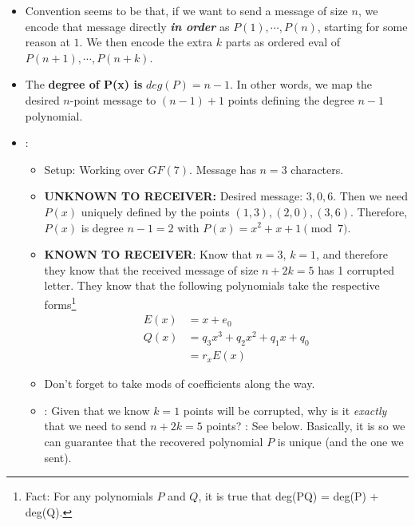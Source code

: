 \documentclass[12pt]{article}
\begin{document}
\begin{itemize}
\begin{itemize}
		\item Convention seems to be that, if we want to send a message of size $n$, we encode that message directly \textbf{\textit{in order}} as $P(1),\cdots,P(n)$, starting for some reason at $1$. We then encode the extra $k$ parts as ordered eval of $P(n+1), \cdots, P(n+k)$. 
		
		\item The \textbf{degree of P(x) is } $deg(P) = n - 1$. In other words, we map the desired $n$-point message to $(n-1) + 1$ points defining the degree $n - 1$ polynomial. 
		
		\item {}:
		\begin{small}
			\begin{itemize}
				\item Setup: Working over $GF(7)$. Message has $n=3$ characters. 
				
				\item \textbf{UNKNOWN TO RECEIVER:} Desired message: $3, 0, 6$. Then we need $P(x)$ uniquely defined by the points $(1, 3), (2, 0), (3, 6)$. Therefore, $P(x)$ is degree $n - 1 = 2$ with $P(x) = x^2 + x + 1 \pmod 7$. 
				
				\item \textbf{KNOWN TO RECEIVER}: Know that $n = 3$, $k = 1$, and therefore they know that the received message of size $n + 2k = 5$ has 1 corrupted letter. They know that the following polynomials take the respective forms\footnote{Fact: For any polynomials $P$ and $Q$, it is true that deg(PQ) = deg(P) + deg(Q).}
				\begin{align}
					E(x) &= x + e_0  \\
					Q(x) &= q_3 x^3 + q_2 x^2 + q_1 x + q_0 \\
					 &= r_x E(x) 
				\end{align}
				
				\item Don't forget to take mods of coefficients along the way. 
				
				\item {}: Given that we know $k=1$ points will be corrupted, why is it \textit{exactly} that we need to send $n + 2k = 5$ points? : See below. Basically, it is so we can guarantee that the recovered polynomial $P$ is unique (and the one we sent). 
			\end{itemize}
		\end{small}
	\end{itemize}
\end{itemize}
\end{document}
